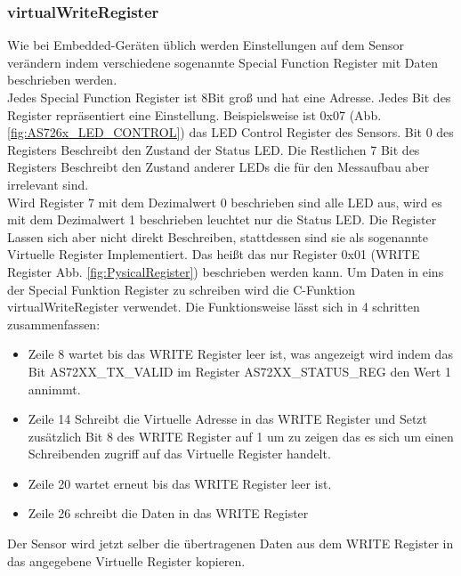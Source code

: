 \subsubsection{virtualWriteRegister}
Wie bei Embedded-Geräten üblich werden Einstellungen auf dem Sensor verändern indem verschiedene sogenannte Special Function Register mit Daten beschrieben werden.\\
Jedes Special Function Register ist 8Bit groß und hat eine Adresse. Jedes Bit des Register repräsentiert eine Einstellung.
Beispielsweise ist 0x07 (Abb. \ref{fig:AS726x_LED_CONTROL}) das LED Control Register des Sensors.
Bit 0 des Registers Beschreibt den Zustand der Status LED.
Die Restlichen 7 Bit des Registers Beschreibt den Zustand anderer LEDs die für den Messaufbau aber irrelevant sind.\\
Wird Register 7 mit dem Dezimalwert 0 beschrieben sind alle LED aus, wird es mit dem Dezimalwert 1 beschrieben leuchtet nur die Status LED.
Die Register Lassen sich aber nicht direkt Beschreiben, stattdessen sind sie als sogenannte Virtuelle Register Implementiert.
Das heißt das nur Register 0x01 (WRITE Register Abb. \ref{fig:PysicalRegister}) beschrieben werden kann.
Um Daten in eins der Special Funktion Register zu schreiben wird die C-Funktion virtualWriteRegister verwendet.
Die Funktionsweise lässt sich in 4 schritten zusammenfassen:
\begin{itemize}
	\item Zeile 8 wartet bis das WRITE Register leer ist, was angezeigt wird indem  das Bit AS72XX\_TX\_VALID im  Register AS72XX\_STATUS\_REG den Wert 1 annimmt.
	\item Zeile 14 Schreibt die Virtuelle Adresse in das WRITE Register und Setzt zusätzlich Bit 8 des WRITE Register auf 1 um zu zeigen das es sich um einen Schreibenden zugriff auf das Virtuelle Register handelt.
	\item Zeile 20 wartet erneut bis das WRITE Register leer ist.
	\item Zeile 26 schreibt die Daten in das WRITE Register
\end{itemize}
Der Sensor wird jetzt selber die übertragenen Daten aus dem WRITE Register in das angegebene Virtuelle Register kopieren.


